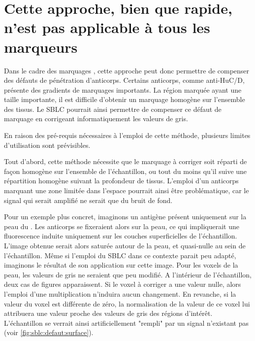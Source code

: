 \documentclass[\main/main.tex]{subfiles}
\begin{document}
    \section{Cette approche, bien que rapide, n'est pas applicable à tous les marqueurs}
    

%
Dans le cadre des marquages \ihc{}, cette approche peut donc permettre de compenser des défauts de pénétration d'anticorps.
%
Certains anticorps, comme anti-HuC/D, présente des gradients de marquages importants.
%
La région marquée ayant une taille importante, il est difficile d'obtenir un marquage homogène sur l'ensemble des tissus.
%
Le SBLC pourrait ainsi permettre de compenser ce défaut de marquage en corrigeant informatiquement les valeurs de gris.

%
En raison des pré-requis nécessaires à l'emploi de cette méthode, plusieurs limites d'utilisation sont prévisibles.

%
Tout d'abord, cette méthode nécessite que le marquage à corriger soit réparti de façon homogène sur l'ensemble de l'échantillon, ou tout du moins qu'il suive une répartition homogène suivant la profondeur de tissus.
%
L'emploi d'un anticorps marquant une zone limitée dans l'espace pourrait ainsi être problématique, car le signal qui serait amplifié ne serait que du bruit de fond.

%
Pour un exemple plus concret, imaginons un antigène présent uniquement sur la peau du \pz{}.
%
Les anticorps se fixeraient alors sur la peau, ce qui impliquerait une fluorescence induite uniquement sur les couches superficielles de l'échantillon.
%
L'image obtenue serait alors saturée autour de la peau, et quasi-nulle au sein de l'échantillon.
%
Même si l'emploi du SBLC dans ce contexte parait peu adapté, imaginons le résultat de son application sur cette image.
%
Pour les voxels de la peau, les valeurs de gris ne seraient que peu modifié.
%
A l'intérieur de l'échantillon, deux cas de figures apparaissent.
%
Si le voxel à corriger a une valeur nulle, alors l'emploi d'une multiplication n'induira aucun changement.
%
En revanche, si la valeur du voxel est différente de zéro, la normalisation de la valeur de ce voxel lui attribuera une valeur proche des valeurs de gris des régions d'intérêt.
%
L'échantillon se verrait ainsi artificiellement "rempli" par un signal n'existant pas (voir \autoref{fig:sblc:defaut:surface}).
\end{document}
